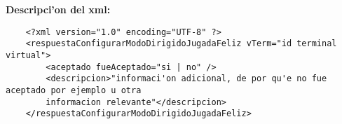 \bf{Descripci'on del xml:}
\begin{verbatim}
    <?xml version="1.0" encoding="UTF-8" ?>
    <respuestaConfigurarModoDirigidoJugadaFeliz vTerm="id terminal virtual">
        <aceptado fueAceptado="si | no" />
        <descripcion>"informaci'on adicional, de por qu'e no fue aceptado por ejemplo u otra
        informacion relevante"</descripcion>
    </respuestaConfigurarModoDirigidoJugadaFeliz>
\end{verbatim}
